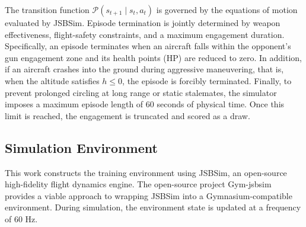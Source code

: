 \documentclass[pdflatex,sn-mathphys-num]{sn-jnl}%
\theoremstyle{thmstyleone}%
\theoremstyle{thmstyletwo}%
\theoremstyle{thmstylethree}%
\begin{document}
The transition function $\mathcal{P}(s_{t+1}\mid s_t, a_t)$ is governed by the equations of motion evaluated by JSBSim. Episode termination is jointly determined by weapon effectiveness, flight-safety constraints, and a maximum engagement duration. Specifically, an episode terminates when an aircraft falls within the opponent’s gun engagement zone and its health points (HP) are reduced to zero. In addition, if an aircraft crashes into the ground during aggressive maneuvering, that is, when the altitude satisfies $h \le 0$, the episode is forcibly terminated. Finally, to prevent prolonged circling at long range or static stalemates, the simulator imposes a maximum episode length of $60$ seconds of physical time. Once this limit is reached, the engagement is truncated and scored as a draw.


\subsection{Simulation Environment}
\label{sec:simulation_architecture}

This work constructs the training environment using JSBSim, an open-source high-fidelity flight dynamics engine. The open-source project Gym-jsbsim \cite{jsbgym} provides a viable approach to wrapping JSBSim into a Gymnasium-compatible environment. During simulation, the environment state is updated at a frequency of $60\text{ Hz}$.
\end{document}
